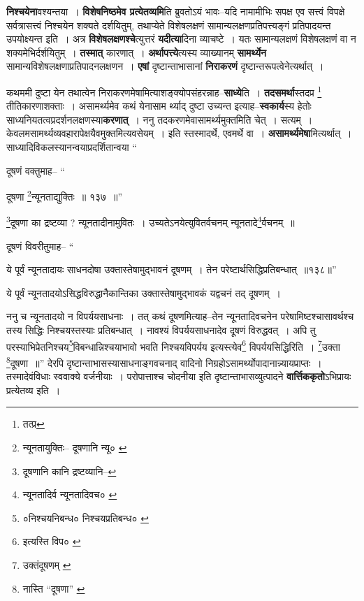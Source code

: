 \documentclass[article,12pt,a4paper]{memoir}
\begin{document}
	  \pstart \textbf{निश्चयेना}वश्यन्तया । \textbf{विशेषनिष्ठमेव प्रत्येतव्यमि}ति ब्रुवतोऽयं भावः--यदि नामामीभिः सपक्ष एव सत्त्वं विपक्षे सर्वत्रासत्त्वं निश्चयेन शक्यते दर्शयितुम्, तथाप्येते विशेषलक्षणं सामान्यलक्षणप्रतिपत्त्यङ्गं प्रतिपादयन्त उपयोक्ष्यन्त इति । अत्र \textbf{विशेषलक्षणश्चे}त्युत्तरं \textbf{यदीत्या}दिना व्याचष्टे । यतः सामान्यलक्षणं विशेषलक्षणं वा न शक्यमेभिर्दर्शयितुम् । \textbf{तस्मात्} कारणात् । \textbf{अर्थापत्त्ये}त्यस्य व्याख्यानम् \textbf{सामर्थ्येन} सामान्यविशेषलक्षणाप्रतिपादनलक्षणन । \textbf{एषां} दृष्टान्ताभासानां \textbf{निराकरणं} दृष्टान्तरूपत्वेनेत्यर्थात् ।
	\pend
      

	  \pstart कथममी दुष्टा येन तथात्वेन निराकरणमेषामित्याशङ्क्योपसंहरन्नाह--\textbf{साध्ये}ति । \textbf{तदसमर्था}स्तदप्र \footnote{तत्प्र} तीतिकारणाशक्ताः । असामर्थ्यमेव कथं येनासाम \leavevmode{}र्थ्याद् दुष्टा उच्यन्त इत्याह--\textbf{स्वकार्य}स्य हेतोः साध्यनियतत्वप्रदर्शनलक्षणस्या\textbf{करणात्} । ननु तदकरणमेवासामर्थ्यमुक्तमिति चेत् । सत्यम् । केवलमसामर्थ्यव्यवहारापेक्षयैवमुक्तमित्यवसेयम् । इति स्तस्मादर्थे, एवमर्थे वा । \textbf{असामर्थ्यमेषा}मित्यर्थात् । साध्यादिविकलस्यानन्वयाप्रदर्शितान्वया    \leavevmode{} “
	  
	दूषणं वक्तुमाह-- “
	  
	दूषणा \footnote{न्यूनतायुक्तिः--\cite{dp-msB} \cite{dp-edP} \cite{dp-edH} दूषणानि न्यू० \cite{dp-edE}}\-न्यूनताद्युक्तिः ॥ १३७ ॥” 
	  
	\footnote{दूषणानि कानि द्रष्टव्यानि--\cite{dp-edE}}\-दूषणा का द्रष्टव्या ? न्यूनतादीनामुवितः । उच्यतेऽनयेत्युवितर्वचनम् न्यूनतादे\footnote{न्यूनतादिर्व \cite{dp-msA} \cite{dp-msB} \cite{dp-edP} \cite{dp-edH} न्यूनतादिवच० \cite{dp-edE} \cite{dp-edN}}\-र्वचनम् ॥ 
	  
	दूषणं विवरीतुमाह-- “
	  
	ये पूर्वं न्यूनतादायः साधनदोषा उक्तास्तेषामुद्भावनं दूषणम् । तेन परेष्टार्थसिद्धिप्रतिबन्धात् ॥१३८॥” 
	  
	ये पूर्वं न्यूनतादयोऽसिद्धविरुद्धानैकान्तिका उक्तास्तेषामुद्भावकं यद्वचनं तद् दूषणम् । 
	  
	ननु च न्यूनतादयो न विपर्ययसाधनाः । तत् कथं दूषणमित्याह--तेन न्यूनतादिवचनेन परेषामिष्टश्चासावर्थश्च तस्य सिद्धिः निश्चयस्तस्याः प्रतिबन्धात् । नावश्यं विपर्ययसाधनादेव दूषणं विरुद्धवत् । अपि तु परस्याभिप्रेतनिश्चय\footnote{०निश्चयनिबन्ध० \cite{dp-msA} \cite{dp-msB} \cite{dp-msC} \cite{dp-msD} \cite{dp-edP} \cite{dp-edH} \cite{dp-edN} निश्चयप्रतिबन्ध० \cite{dp-edE}}\-विबन्धान्निश्चयाभावो भवति निश्चयविपर्यय इत्यस्त्येव\footnote{इत्यस्ति विप० \cite{dp-msA} \cite{dp-edP} \cite{dp-edH} \cite{dp-edE}} विपर्ययसिद्धिरिति । \footnote{उक्तंदूषणम् \cite{dp-edE}}\-उक्ता \footnote{नास्ति “दूषणा” \cite{dp-msA} \cite{dp-msB} \cite{dp-edP} \cite{dp-edH}}\-दूषणा ॥” देरपि दृष्टान्ताभासस्यासाधनाङ्गवचनाद् वादिनो निग्रहोऽसामर्थ्योपादानान्न्यायप्राप्तः । तस्मादेवंविधाः स्ववाक्ये वर्जनीयाः । परोपात्ताश्च चोदनीया इति दृष्टान्ताभासव्युत्पादने \textbf{वार्त्तिककृतो}ऽभिप्रायः प्रत्येतव्य इति ।
	\pend
      
\end{document}
